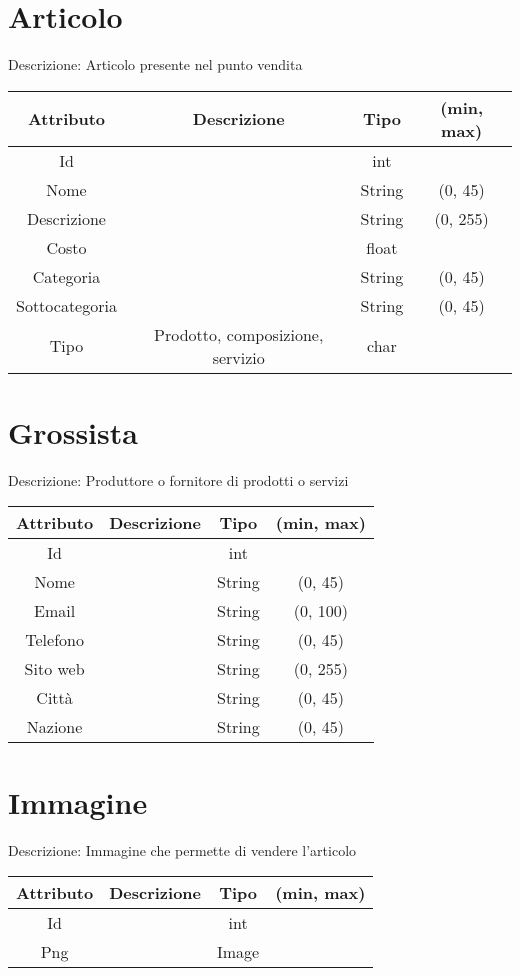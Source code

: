 \section{Articolo}
Descrizione: Articolo presente nel punto vendita
\begin{center}
    \begin{tabular}{||c c c c||}
        \hline
        Attributo & Descrizione & Tipo & (min, max) \\ [0.5ex]
        \hline \hline
        Id &  & int &  \\
        Nome &  & String & (0, 45) \\
        Descrizione &  & String & (0, 255) \\
        Costo &  & float &  \\
        Categoria &  & String & (0, 45) \\
        Sottocategoria &  & String & (0, 45) \\
        Tipo & Prodotto, composizione, servizio & char &  \\
        \hline
    \end{tabular}
\end{center}


\section{Grossista}
Descrizione: Produttore o fornitore di prodotti o servizi
\begin{center}
    \begin{tabular}{||c c c c||}
        \hline
        Attributo & Descrizione & Tipo & (min, max) \\ [0.5ex]
        \hline \hline
        Id &  & int &  \\
        Nome &  & String & (0, 45) \\
        Email &  & String & (0, 100) \\
        Telefono &  & String & (0, 45) \\
        Sito web &  & String & (0, 255) \\
        Città &  & String & (0, 45) \\
        Nazione &  & String & (0, 45) \\
        \hline
    \end{tabular}
\end{center}


\section{Immagine}
Descrizione: Immagine che permette di vendere l'articolo
\begin{center}
    \begin{tabular}{||c c c c||}
        \hline
        Attributo & Descrizione & Tipo & (min, max) \\ [0.5ex]
        \hline \hline
        Id &  & int &  \\
        Png &  & Image &  \\
        \hline
    \end{tabular}
\end{center}


